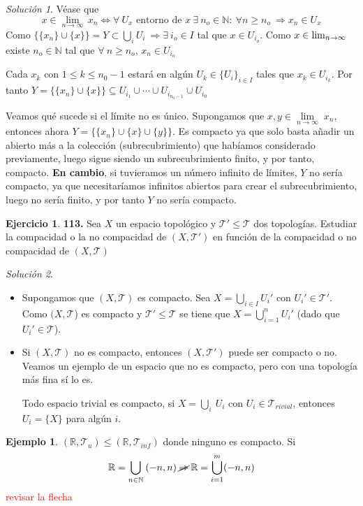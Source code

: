 \documentclass[12pt,twoside]{report}
\newcommand\mc[1]{\mathcal{#1}}
\theoremstyle{azul}
\theoremstyle{azul2}
\theoremstyle{plain}
\theoremstyle{definition}
\newtheorem*{eje}{Ejemplo}
\newtheorem*{ejer}{Ejercicio}
\theoremstyle{remark}
\newtheorem*{sol}{Solución}
\providecommand{\Lim}[3]{\underset{#1\to#2}{\lim}\; #3}
\begin{document}
\begin{sol}
    Véase que 
    $$x \in \lim_{n \to \infty}\,x_n \iff \forall \: U_x \text{ entorno de } x \: \exists \: n_o \in \mathbb{N} : \: \forall n \geq n_o \: \Rightarrow x_n \in U_x$$
Como $\{\{x_n\} \cup \{x\}\}=Y \subset \underset{i}{\bigcup} U_i \: \Rightarrow \exists \: i_o \in I$ tal que $x \in U_{i_o}$. Como $x \in \lim_{n \to \infty}\displaystyle$ existe $n_o \in \mathbb{N}$ tal que $\forall \: n \geq n_o$, $x_n \in U_{i_o}$

Cada $x_k$ con $1\leq k\leq n_0-1$ estará en algún $U_k\in \{U_i\}_{i\in I}$ tales que $x_k\in U_{i_k}$. Por tanto $Y=\{\{x_n\}\cup \{x\}\}\subseteq U_{i_1}\cup\cdots \cup U_{i_{n_0-1}}\cup U_{i_0}$

Veamos qué sucede si el límite no es único. Supongamos que $x,y \in \Lim{n}{\infty}{x_n}$, entonces ahora $Y=\{\{x_n\} \cup \{x\} \cup \{y\}\}$. Es compacto ya que solo basta añadir un abierto más a la colección (subrecubrimiento) que habíamos considerado previamente, luego sigue siendo un subrecubrimiento finito, y por tanto, compacto. \textbf{En cambio}, si tuvieramos un número infinito de límites, $Y$ no sería compacto, ya que necesitaríamos infinitos abiertos para crear el subrecubrimiento, luego no sería finito, y por tanto $Y$ no sería compacto. 
\end{sol}
\begin{ejer} \textbf{113.} 
Sea $X$ un espacio topológico y $\mc{T}'\leq \mc{T}$ dos topologías. Estudiar la compacidad o la no compacidad de $(X,\mc{T}')$ en función de la compacidad o no compacidad de $(X,\mc{T})$
\end{ejer}
\begin{sol}\:\vspace{-5mm}
\begin{itemize}
    \item Supongamos que $(X,\mc{T})$ es compacto. Sea $X=\underset{i\in I}{\bigcup}U_i'$ con $U_i'\in \mc{T}'$. Como $(X,\mc{T}$) es compacto y $\mc{T}'\leq \mc{T}$ se tiene que $\displaystyle X=\bigcup_{i=1}^n U_i'$ (dado que $U_i'\in \mc{T}$).
\item Si $(X, \mc{T})$ no es compacto, entonces $(X, \mc{T}')$ puede ser compacto o no. Veamos un ejemplo de un espacio que no es compacto, pero con una topología más fina sí lo es.  

Todo espacio trivial es compacto, si $X=\underset{i}{\bigcup} \:U_i$ con $U_i \in \mc{T}_{rivial}$, entonces $U_i=\{X\}$ para algún $i$.
\end{itemize}
\begin{eje}
    $(\mathbb{R}, \mc{T}_u) \leq (\mathbb{R}, \mc{T}_{inf})$ donde ninguno es compacto. Si $$\mathbb{R}=\bigcup_{n \in \mathbb{N}} \: (-n,n) \: \cancel{\Rightarrow} \: \mathbb{R}=\bigcup_{i=1}^m (-n,n)$$ 
\textcolor{red}{revisar la flecha}\end{eje}
\end{sol}
\end{document}
